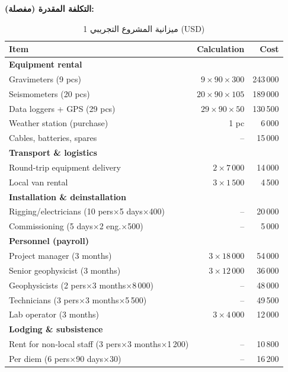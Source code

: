 \documentclass[12pt,a4paper]{article}
\theoremstyle{remark}
\begin{document}
	\textbf{التكلفة المقدرة (مفصلة):}
	\begin{otherlanguage}{english}
		\begin{table}[htbp]
			\centering
			\caption{ميزانية المشروع التجريبي 1 (USD)}
			\label{tab:budget-building}
			\small
			\begin{tabular}{lrr}
				\toprule
				\textbf{Item} & \textbf{Calculation} & \textbf{Cost} \\
				\midrule
				\multicolumn{3}{l}{\textbf{Equipment rental}} \\
				Gravimeters (9 pcs) & \(9\times90\times300\) & 243\,000 \\
				Seismometers (20 pcs) & \(20\times90\times105\) & 189\,000 \\
				Data loggers + GPS (29 pcs) & \(29\times90\times50\) & 130\,500 \\
				Weather station (purchase) & 1 pc & 6\,000 \\
				Cables, batteries, spares & – & 15\,000 \\
				\multicolumn{3}{l}{\textbf{Transport \& logistics}} \\
				Round-trip equipment delivery & \(2\times7\,000\) & 14\,000 \\
				Local van rental & \(3\times1\,500\) & 4\,500 \\
				\multicolumn{3}{l}{\textbf{Installation \& deinstallation}} \\
				Rigging/electricians (10 pers\(\times\)5 days\(\times\)400) & – & 20\,000 \\
				Commissioning (5 days\(\times\)2 eng.\(\times\)500) & – & 5\,000 \\
				\multicolumn{3}{l}{\textbf{Personnel (payroll)}} \\
				Project manager (3 months) & \(3\times18\,000\) & 54\,000 \\
				Senior geophysicist (3 months) & \(3\times12\,000\) & 36\,000 \\
				Geophysicists (2 pers\(\times\)3 months\(\times\)8\,000) & – & 48\,000 \\
				Technicians (3 pers\(\times\)3 months\(\times\)5\,500) & – & 49\,500 \\
				Lab operator (3 months) & \(3\times4\,000\) & 12\,000 \\
				\multicolumn{3}{l}{\textbf{Lodging \& subsistence}} \\
				Rent for non‑local staff (3 pers\(\times\)3 months\(\times\)1\,200) & – & 10\,800 \\
				Per diem (6 pers\(\times\)90 days\(\times\)30) & – & 16\,200 \\

\end{tabular}
\end{table}
\end{otherlanguage}
\end{document}

